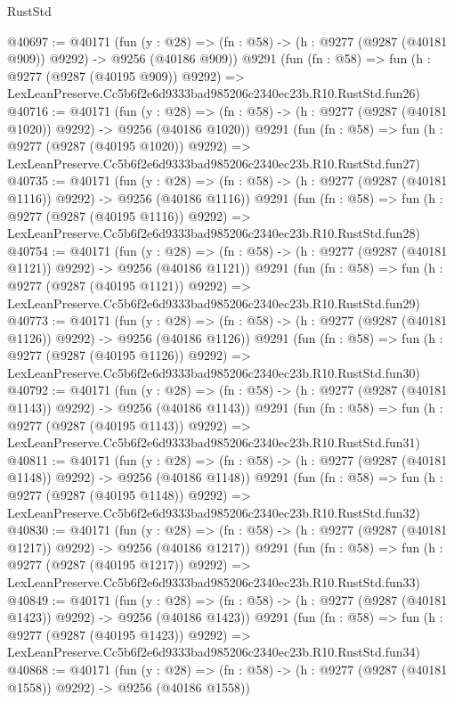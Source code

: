 \begin{lexlean}{RustStd}
\begin{coremodule}
@40697 := @40171
    (fun (y : @28) => (fn : @58) -> (h : @9277 (@9287 (@40181 @909)) @9292) -> @9256 (@40186 @909))
    @9291
    (fun (fn : @58) =>
    fun (h : @9277 (@9287 (@40195 @909)) @9292) =>
    LexLeanPreserve.Cc5b6f2e6d9333bad985206c2340ec23b.R10.RustStd.fun26)
@40716 := @40171
    (fun (y : @28) =>
    (fn : @58) -> (h : @9277 (@9287 (@40181 @1020)) @9292) -> @9256 (@40186 @1020))
    @9291
    (fun (fn : @58) =>
    fun (h : @9277 (@9287 (@40195 @1020)) @9292) =>
    LexLeanPreserve.Cc5b6f2e6d9333bad985206c2340ec23b.R10.RustStd.fun27)
@40735 := @40171
    (fun (y : @28) =>
    (fn : @58) -> (h : @9277 (@9287 (@40181 @1116)) @9292) -> @9256 (@40186 @1116))
    @9291
    (fun (fn : @58) =>
    fun (h : @9277 (@9287 (@40195 @1116)) @9292) =>
    LexLeanPreserve.Cc5b6f2e6d9333bad985206c2340ec23b.R10.RustStd.fun28)
@40754 := @40171
    (fun (y : @28) =>
    (fn : @58) -> (h : @9277 (@9287 (@40181 @1121)) @9292) -> @9256 (@40186 @1121))
    @9291
    (fun (fn : @58) =>
    fun (h : @9277 (@9287 (@40195 @1121)) @9292) =>
    LexLeanPreserve.Cc5b6f2e6d9333bad985206c2340ec23b.R10.RustStd.fun29)
@40773 := @40171
    (fun (y : @28) =>
    (fn : @58) -> (h : @9277 (@9287 (@40181 @1126)) @9292) -> @9256 (@40186 @1126))
    @9291
    (fun (fn : @58) =>
    fun (h : @9277 (@9287 (@40195 @1126)) @9292) =>
    LexLeanPreserve.Cc5b6f2e6d9333bad985206c2340ec23b.R10.RustStd.fun30)
@40792 := @40171
    (fun (y : @28) =>
    (fn : @58) -> (h : @9277 (@9287 (@40181 @1143)) @9292) -> @9256 (@40186 @1143))
    @9291
    (fun (fn : @58) =>
    fun (h : @9277 (@9287 (@40195 @1143)) @9292) =>
    LexLeanPreserve.Cc5b6f2e6d9333bad985206c2340ec23b.R10.RustStd.fun31)
@40811 := @40171
    (fun (y : @28) =>
    (fn : @58) -> (h : @9277 (@9287 (@40181 @1148)) @9292) -> @9256 (@40186 @1148))
    @9291
    (fun (fn : @58) =>
    fun (h : @9277 (@9287 (@40195 @1148)) @9292) =>
    LexLeanPreserve.Cc5b6f2e6d9333bad985206c2340ec23b.R10.RustStd.fun32)
@40830 := @40171
    (fun (y : @28) =>
    (fn : @58) -> (h : @9277 (@9287 (@40181 @1217)) @9292) -> @9256 (@40186 @1217))
    @9291
    (fun (fn : @58) =>
    fun (h : @9277 (@9287 (@40195 @1217)) @9292) =>
    LexLeanPreserve.Cc5b6f2e6d9333bad985206c2340ec23b.R10.RustStd.fun33)
@40849 := @40171
    (fun (y : @28) =>
    (fn : @58) -> (h : @9277 (@9287 (@40181 @1423)) @9292) -> @9256 (@40186 @1423))
    @9291
    (fun (fn : @58) =>
    fun (h : @9277 (@9287 (@40195 @1423)) @9292) =>
    LexLeanPreserve.Cc5b6f2e6d9333bad985206c2340ec23b.R10.RustStd.fun34)
@40868 := @40171
    (fun (y : @28) =>
    (fn : @58) -> (h : @9277 (@9287 (@40181 @1558)) @9292) -> @9256 (@40186 @1558))

\end{coremodule}
\end{lexlean}
